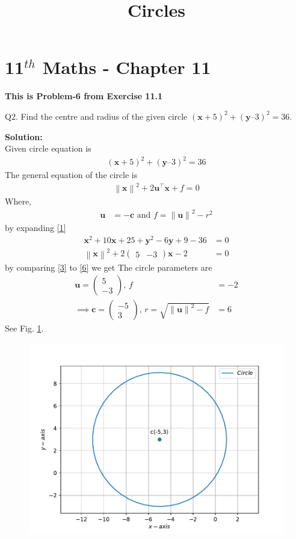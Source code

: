 \documentclass[12pt]{article}
\providecommand{\norm}[1]{\left\lVert#1\right\rVert}
\newcommand{\solution}{\noindent \textbf{Solution: }}
\newcommand{\myvec}[1]{\ensuremath{\begin{pmatrix}#1\end{pmatrix}}}
\let\vec\mathbf
\begin{document}
\begin{center}
\title{\textbf{Circles}}
\date{\vspace{-5ex}} %
\maketitle
\end{center}
\setcounter{page}{1}
\section{11$^{th}$ Maths - Chapter 11}
\textbf{This is Problem-6 from Exercise 11.1 }

Q2. Find the centre and radius of the given circle $(\vec{x} + 5)^2 + (\vec{y} – 3)^2 = 36.$

\solution
\\
Given circle equation is
\begin{align}
	(\vec{x} + 5)^2 + (\vec{y} – 3)^2 = 36 \label{1}
\end{align}
The general equation of  the circle is 
\begin{align}
	\norm{\vec{x}}^{2} + 2\vec{u}^{\top}\vec{x} + f = 0
\end{align}
Where,
\begin{align}
	\vec{u} &= -\vec{c} \text{ and } f = \norm{\vec{u}}^{2} - r^{2}\label{3}
\end{align}
by expanding \eqref{1}
\begin{align}
	\vec{x}^2+10\vec{x}+25+\vec{y}^2-6\vec{y}+9-36&=0\\
	\norm{\vec{x}}^2+2\myvec{5 & -3}\vec{x}-2&=0\label{6}
\end{align}	
by comparing \eqref{3} to \eqref{6} we get
\fi
The circle parameters are
\begin{align}
 \vec{u}=\myvec{5\\ -3},\,
 f&=-2\\
\implies \vec{c}=\myvec{-5 \\ 3},\,
	r=\sqrt{\norm{\vec{u}}^2-f}
&= 6
\end{align}
See Fig. 
\ref{fig:chapters/11/11/1/6/Fig1}.
\begin{figure}[!h]
	\begin{center} 
	   \includegraphics[width=\columnwidth]{chapters/11/11/1/6/figs/fig.pdf}
	\end{center}
\caption{}
\label{fig:chapters/11/11/1/6/Fig1}
\end{figure}
\end{document}
